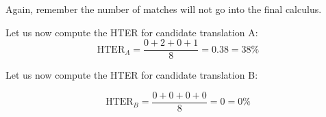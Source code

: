 \documentclass[output=paper]{langscibook}
\begin{document}
Again, remember the number of matches will not go into the final calculus.

\largerpage


\begin{table}[H]
\caption{operations needed to transform candidate A into post-edited segment.}
\label{tab:rossi:8}
\end{table}

Let us now compute the HTER for candidate translation A:
\begin{equation}
\text{HTER}_A=\frac{0+2+0+1}{8}=0.38=38\%
\end{equation}



\begin{table}[H]
\caption{operations needed to transform candidate B into post-edited segment.}
\label{tab:rossi:9}
\end{table}

Let us now compute the HTER for candidate translation B:

\begin{equation}
\text{HTER}_B=\frac{0+0+0+0} 8=0=0\%
\end{equation}

\end{document}
